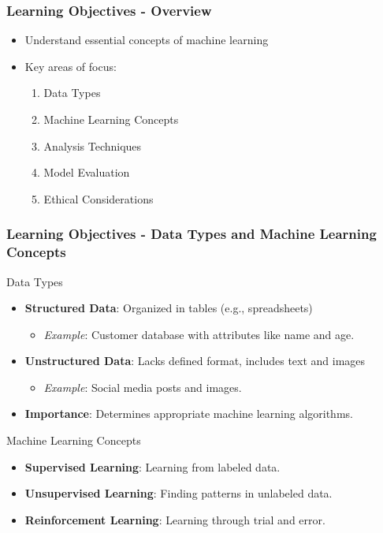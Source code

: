 \documentclass[aspectratio=169]{beamer}
\begin{document}
\begin{frame}[fragile]
    \frametitle{Learning Objectives - Overview}
    \begin{itemize}
        \item Understand essential concepts of machine learning
        \item Key areas of focus:
            \begin{enumerate}
                \item Data Types
                \item Machine Learning Concepts
                \item Analysis Techniques
                \item Model Evaluation
                \item Ethical Considerations
            \end{enumerate}
    \end{itemize}
\end{frame}

\begin{frame}[fragile]
    \frametitle{Learning Objectives - Data Types and Machine Learning Concepts}
   
    \begin{block}{Data Types}
        \begin{itemize}
            \item \textbf{Structured Data}: Organized in tables (e.g., spreadsheets)
                \begin{itemize}
                    \item \textit{Example}: Customer database with attributes like name and age.
                \end{itemize}
            \item \textbf{Unstructured Data}: Lacks defined format, includes text and images
                \begin{itemize}
                    \item \textit{Example}: Social media posts and images.
                \end{itemize}
            \item \textbf{Importance}: Determines appropriate machine learning algorithms.
        \end{itemize}
    \end{block}

    \begin{block}{Machine Learning Concepts}
        \begin{itemize}
            \item \textbf{Supervised Learning}: Learning from labeled data.
            \item \textbf{Unsupervised Learning}: Finding patterns in unlabeled data.
            \item \textbf{Reinforcement Learning}: Learning through trial and error.
        \end{itemize}
    \end{block}
\end{frame}
\end{document}
